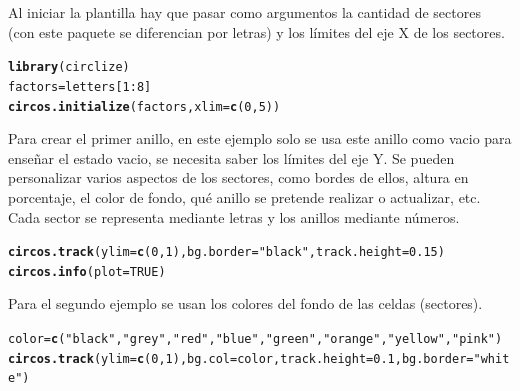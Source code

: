 \documentclass{article}\usepackage[]{graphicx}\usepackage[]{color}
\makeatletter
\newcommand{\hlnum}[1]{\textcolor[rgb]{0.686,0.059,0.569}{#1}}%
\newcommand{\hlstr}[1]{\textcolor[rgb]{0.192,0.494,0.8}{#1}}%
\newcommand{\hlopt}[1]{\textcolor[rgb]{0,0,0}{#1}}%
\newcommand{\hlstd}[1]{\textcolor[rgb]{0.345,0.345,0.345}{#1}}%
\newcommand{\hlkwb}[1]{\textcolor[rgb]{0.69,0.353,0.396}{#1}}%
\newcommand{\hlkwc}[1]{\textcolor[rgb]{0.333,0.667,0.333}{#1}}%
\newcommand{\hlkwd}[1]{\textcolor[rgb]{0.737,0.353,0.396}{\textbf{#1}}}%
\newenvironment{kframe}{%
 \def\at@end@of@kframe{}%
 \ifinner\ifhmode%
  \def\at@end@of@kframe{\end{minipage}}%
  \begin{minipage}{\columnwidth}%
 \fi\fi%
 \def\FrameCommand##1{\hskip\@totalleftmargin \hskip-\fboxsep
 \colorbox{shadecolor}{##1}\hskip-\fboxsep
     \hskip-\linewidth \hskip-\@totalleftmargin \hskip\columnwidth}%
 \MakeFramed {\advance\hsize-\width
   \@totalleftmargin\z@ \linewidth\hsize
   \@setminipage}}%
 {\par\unskip\endMakeFramed%
 \at@end@of@kframe}
\newenvironment{knitrout}{}{} %
\makeatother
\begin{document}
Al iniciar la plantilla hay que pasar como argumentos la cantidad de sectores (con este paquete se diferencian por letras) y los l\'imites del eje X de los sectores.
\begin{knitrout}
\color{fgcolor}\begin{kframe}
\begin{alltt}
\hlkwd{library}\hlstd{(circlize)}
\hlstd{factors} \hlkwb{=} \hlstd{letters[}\hlnum{1}\hlopt{:}\hlnum{8}\hlstd{]}
\hlkwd{circos.initialize}\hlstd{(factors,} \hlkwc{xlim} \hlstd{=} \hlkwd{c}\hlstd{(}\hlnum{0}\hlstd{,} \hlnum{5}\hlstd{))}
\end{alltt}
\end{kframe}
\end{knitrout}
Para crear el primer anillo, en este ejemplo solo se usa este anillo como vacio para ense\~nar el estado vacio, se necesita saber los l\'imites del eje Y. Se pueden personalizar varios aspectos de los sectores, como bordes de ellos, altura en porcentaje, el color de fondo, qu\'e anillo se pretende realizar o actualizar, etc. Cada sector se representa mediante letras y los anillos mediante n\'umeros.
\begin{knitrout}
\color{fgcolor}\begin{kframe}
\begin{alltt}
\hlkwd{circos.track}\hlstd{(}\hlkwc{ylim} \hlstd{=} \hlkwd{c}\hlstd{(}\hlnum{0}\hlstd{,} \hlnum{1}\hlstd{),}  \hlkwc{bg.border} \hlstd{=} \hlstr{"black"}\hlstd{,} \hlkwc{track.height} \hlstd{=} \hlnum{0.15}\hlstd{)}
\hlkwd{circos.info}\hlstd{(}\hlkwc{plot} \hlstd{=} \hlnum{TRUE}\hlstd{)}
\end{alltt}
\end{kframe}
\end{knitrout}
Para el segundo ejemplo se usan los colores del fondo de las celdas (sectores).
\begin{knitrout}
\color{fgcolor}\begin{kframe}
\begin{alltt}
\hlstd{color}\hlkwb{=}\hlkwd{c}\hlstd{(}\hlstr{"black"}\hlstd{,} \hlstr{"grey"}\hlstd{,} \hlstr{"red"}\hlstd{,} \hlstr{"blue"}\hlstd{,} \hlstr{"green"}\hlstd{,} \hlstr{"orange"}\hlstd{,} \hlstr{"yellow"}\hlstd{,} \hlstr{"pink"}\hlstd{)}
\hlkwd{circos.track}\hlstd{(}\hlkwc{ylim} \hlstd{=} \hlkwd{c}\hlstd{(}\hlnum{0}\hlstd{,} \hlnum{1}\hlstd{),} \hlkwc{bg.col} \hlstd{=color,} \hlkwc{track.height} \hlstd{=} \hlnum{0.1}\hlstd{,} \hlkwc{bg.border} \hlstd{=} \hlstr{"white"}\hlstd{)}
\end{alltt}
\end{kframe}
\end{knitrout}
\end{document}
